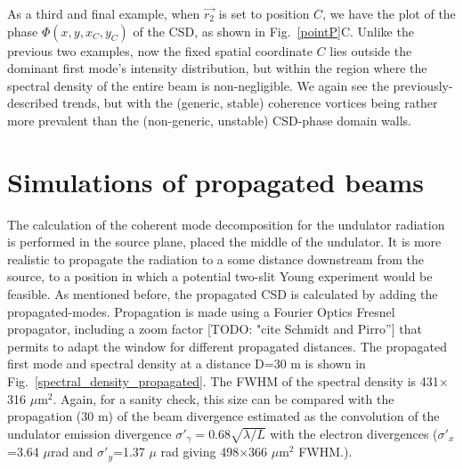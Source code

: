 \documentclass{iucr}              %
\newcommand{\todo}[1]{{\color{red}[TODO: "#1'']}}
\newcommand{\inblue}[1]{{\color{blue}#1}}
\begin{document}
As a third and final example, when $\vec{r_2}$ is set to position $C$, we have the plot of the phase $\Phi(x,y,x_C,y_C)$ of the CSD, as shown in \inblue{Fig.~\ref{pointP}C}.  Unlike the previous two examples, now the fixed spatial coordinate $C$ lies outside the dominant first mode's intensity distribution, but within the region where the spectral density of the entire beam is non-negligible.  We again see the previously-described trends, but with the (generic, stable) coherence vortices being rather more prevalent than the (non-generic, unstable) CSD-phase domain walls.    


\section{Simulations of propagated beams}

The calculation of the coherent mode decomposition for the undulator radiation is performed in the source plane, placed the middle of the undulator. It is more realistic to propagate the radiation to a some distance downstream from the source, to a position in which a potential two-slit Young experiment would be feasible. As mentioned before, the propagated CSD is calculated by adding the propagated-modes. Propagation is made using a Fourier Optics Fresnel propagator, including a zoom factor \todo{cite Schmidt and Pirro} that permits to adapt the window for different propagated distances. The propagated first mode and spectral density at a distance D=30 m is shown in \inblue{Fig.~\ref{spectral_density_propagated}}. The FWHM of the spectral density is 431$\times$316 $\mu$m$^2$. Again, for a sanity check, this size can be compared with the propagation (30 m) of the beam divergence estimated as the convolution of the undulator emission divergence $\sigma'_\gamma=0.68\sqrt{\lambda/L}$ with the electron divergences ($\sigma'_x$=3.64 $\mu$rad and $\sigma'_y$=1.37 $\mu$ rad giving 498$\times$366 $\mu$m$^2$ FWHM.). 
\end{document}
